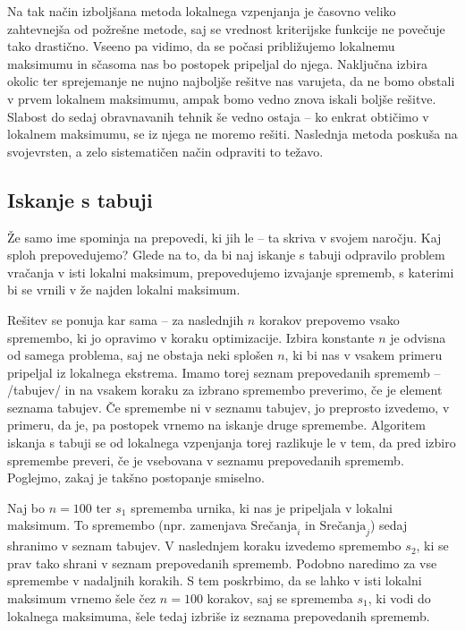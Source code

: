 \documentclass[a4paper, 10pt]{article}
\begin{document}
Na tak način izboljšana metoda lokalnega vzpenjanja je časovno veliko zahtevnejša od
požrešne metode, saj se vrednost kriterijske funkcije ne povečuje tako drastično. Vseeno
pa vidimo, da se počasi približujemo lokalnemu maksimumu in sčasoma nas bo postopek
pripeljal do njega. Naključna izbira okolic ter sprejemanje ne nujno najboljše rešitve
nas varujeta, da ne bomo obstali v prvem lokalnem maksimumu, ampak bomo vedno znova
iskali boljše rešitve.
Slabost do sedaj obravnavanih tehnik še vedno ostaja -- ko enkrat obtičimo v lokalnem
maksimumu, se iz njega ne moremo rešiti. Naslednja metoda poskuša na svojevrsten, a zelo
sistematičen način odpraviti to težavo.

\subsection{Iskanje s tabuji}

Že samo ime spominja na prepovedi, ki jih le -- ta skriva v svojem naročju. Kaj sploh prepovedujemo?
Glede na to, da bi naj iskanje s tabuji odpravilo problem vračanja v isti lokalni maksimum,
prepovedujemo izvajanje sprememb, s katerimi bi se vrnili v že najden lokalni maksimum.

Rešitev se ponuja kar sama -- za naslednjih $n$ korakov prepovemo vsako spremembo, ki jo
opravimo v koraku optimizacije. Izbira konstante $n$ je odvisna od samega problema, saj
ne obstaja neki splošen $n$, ki bi nas v vsakem primeru pripeljal iz lokalnega ekstrema.
Imamo torej seznam prepovedanih sprememb -- /tabujev/ in na vsakem koraku za izbrano
spremembo preverimo, če je element seznama tabujev. Če spremembe ni v seznamu tabujev, jo
preprosto izvedemo, v primeru, da je, pa postopek vrnemo na iskanje druge spremembe.
Algoritem iskanja s tabuji se od lokalnega vzpenjanja torej razlikuje le v tem, da pred
izbiro spremembe preveri, če je vsebovana v seznamu prepovedanih sprememb. Poglejmo, zakaj
je takšno postopanje smiselno.

Naj bo $n = 100$ ter $s_1$ sprememba urnika, ki nas je pripeljala v lokalni maksimum. To
spremembo (npr. zamenjava $\text{Srečanja}_i$ in $\text{Srečanja}_j$) sedaj shranimo v
seznam tabujev. V naslednjem koraku izvedemo spremembo $s_2$, ki se prav tako shrani v
seznam prepovedanih sprememb. Podobno naredimo za vse spremembe v nadaljnih korakih. S
tem poskrbimo, da se lahko v isti lokalni maksimum vrnemo šele čez $n = 100$ korakov, saj
se sprememba $s_1$, ki vodi do lokalnega maksimuma, šele tedaj izbriše iz seznama
prepovedanih sprememb.
\end{document}

